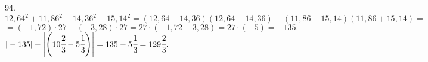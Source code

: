 94. $12,64^2+11,86^2-14,36^2-15,14^2=(12,64-14,36)(12,64+14,36)+(11,86-15,14)(11,86+15,14)=$\\$=
(-1,72)\cdot27+(-3,28)\cdot27=27\cdot(-1,72-3,28)=27\cdot(-5)=-135.$\\
$|-135|-\left |\left(10\cfrac{2}{3}-5\cfrac{1}{3}\right)\right |=135-5\cfrac{1}{3}=129\cfrac{2}{3}.$\\

